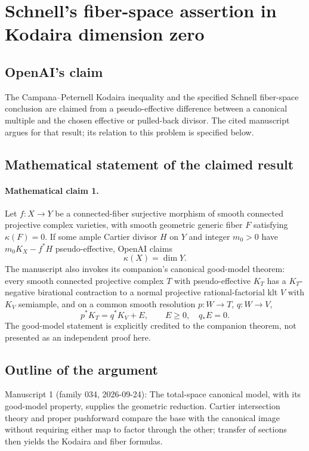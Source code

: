 \documentclass[11pt]{article}
\begin{document}
\section*{Schnell’s fiber-space assertion in Kodaira dimension zero}

\subsection{OpenAI's claim}
The Campana--Peternell Kodaira inequality and the specified Schnell fiber-space conclusion are claimed from a pseudo-effective difference between a canonical multiple and the chosen effective or pulled-back divisor. The cited manuscript argues for that result; its relation to this problem is specified below.

\subsection{Mathematical statement of the claimed result}
\paragraph{Mathematical claim 1.} Let $f:X\to Y$ be a connected-fiber surjective morphism of smooth connected projective complex varieties, with smooth geometric generic fiber $F$ satisfying $\kappa(F)=0$. If some ample Cartier divisor $H$ on $Y$ and integer $m_0>0$ have $m_0K_X-f^*H$ pseudo-effective, OpenAI claims
\[
\kappa(X)=\dim Y.
\]
The manuscript also invokes its companion's canonical good-model theorem: every smooth connected projective complex $T$ with pseudo-effective $K_T$ has a $K_T$-negative birational contraction to a normal projective rational-factorial klt $V$ with $K_V$ semiample, and on a common smooth resolution $p:W\to T$, $q:W\to V$,
\[
p^*K_T=q^*K_V+E,\qquad E\ge0,\quad q_*E=0.
\]
The good-model statement is explicitly credited to the companion theorem, not presented as an independent proof here.

\subsection{Outline of the argument}
Manuscript 1 (family 034, 2026-09-24): The total-space canonical model, with its good-model property, supplies the geometric reduction. Cartier intersection theory and proper pushforward compare the base with the canonical image without requiring either map to factor through the other; transfer of sections then yields the Kodaira and fiber formulas.
\end{document}
